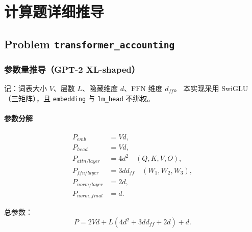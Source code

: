 \documentclass[UTF8,11pt,a4paper]{ctexart}
\begin{document}

% 


% 


\section{计算题详细推导}

\subsection{Problem \texttt{transformer\_accounting}}

\subsubsection{参数量推导（GPT-2 XL-shaped）}

记：词表大小 \(V\)、层数 \(L\)、隐藏维度 \(d\)、FFN 维度 \(d_{ff}\)。
本实现采用 SwiGLU（三矩阵），且 \texttt{embedding} 与 \texttt{lm\_head} 不绑权。

\paragraph{参数分解}
\begin{align}
P_{emb} &= Vd,\\
P_{head} &= Vd,\\
P_{attn/layer} &= 4d^2\quad(Q,K,V,O),\\
P_{ffn/layer} &= 3dd_{ff}\quad(W_1,W_2,W_3),\\
P_{norm/layer} &= 2d,\\
P_{norm,final} &= d.
\end{align}

总参数：
\[
P = 2Vd + L(4d^2 + 3dd_{ff} + 2d) + d.
\]
\end{document}
